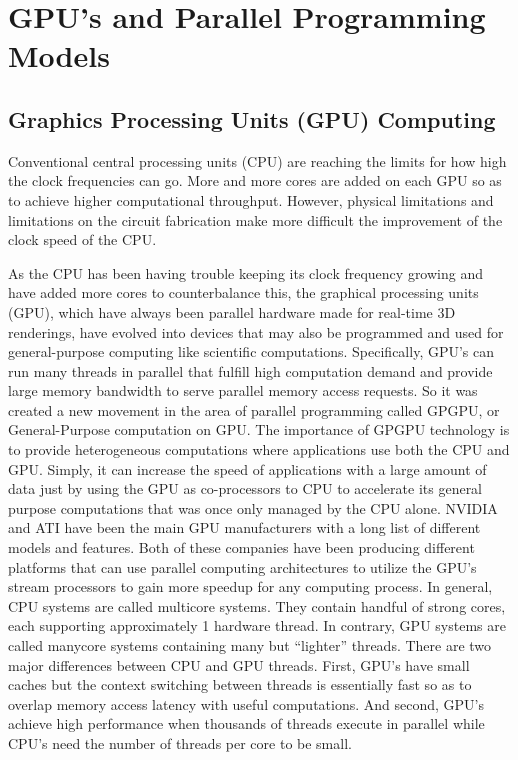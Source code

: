 \chapter{GPU’s and Parallel Programming Models}


\section{Graphics Processing Units (GPU) Computing}
Conventional central processing units (CPU) are reaching the limits for how high the clock frequencies can go. More and more cores are added on each GPU so as to achieve higher computational throughput. However, physical limitations and limitations on the circuit fabrication make more difficult the improvement of the clock speed of the CPU.

As the CPU has been having trouble keeping its clock frequency growing and have added more cores to counterbalance this, the graphical processing units (GPU), which have always been parallel hardware made for real-time 3D renderings, have evolved into devices that may also be programmed and used for general-purpose computing like scientific computations. Specifically, GPU’s can run many threads in parallel that fulfill high computation demand and provide large memory bandwidth to serve parallel memory access requests.
So it was created a new movement in the area of parallel programming called GPGPU, or General-Purpose computation on GPU. The importance of GPGPU technology is to provide heterogeneous computations where applications use both the CPU and GPU. Simply, it can increase the speed of applications with a large amount of data just by using the GPU as co-processors to CPU to accelerate its general purpose computations that was once only managed by the CPU alone. NVIDIA and ATI have been the main GPU manufacturers with a long list of different models and features. Both of these companies have been producing different platforms that can use parallel computing architectures to utilize the GPU’s stream processors to gain more speedup for any computing process. 
In general, CPU systems are called multicore systems. They contain handful of strong cores, each supporting approximately 1 hardware thread. In contrary, GPU systems are called manycore systems containing many but “lighter” threads. There are two major differences between CPU and GPU threads. First, GPU’s have small caches but the context switching between threads is essentially fast so as to overlap memory access latency with useful computations. And second, GPU’s achieve high performance when thousands of threads execute in parallel while CPU’s need the number of threads per core to be small.
 
